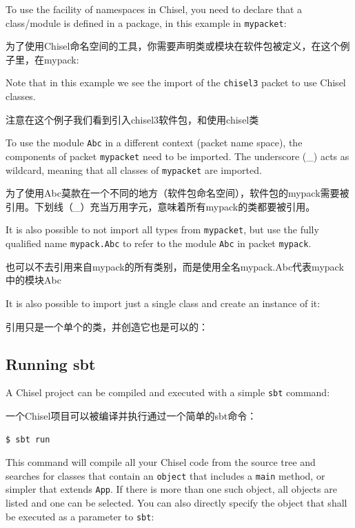 \documentclass[%
    10pt,
    headinclude, footexclude,
    openright, %
    notitlepage,
    cleardoubleempty,
    headsepline,
    pointlessnumbers,
    bibtotoc, idxtotoc,
    ]{scrbook}
\newcommand{\code}[1]{{\small{\texttt{#1}}}}
\begin{document}
To use the facility of namespaces in Chisel, you need to declare that a class/module
is defined in a package, in this example in \code{mypacket}:

为了使用Chisel命名空间的工具，你需要声明类或模块在软件包被定义，在这个例子里，在mypack:


\noindent Note that in this example we see the import of the \code{chisel3} packet
to use Chisel classes.

注意在这个例子我们看到引入chisel3软件包，和使用chisel类

To use the module \code{Abc} in a different context (packet name space),
the components of packet \code{mypacket} need to be imported. The underscore
(\_) acts as wildcard, meaning that all classes of \code{mypacket} are imported.

为了使用Abc莫款在一个不同的地方（软件包命名空间），软件包的mypack需要被引用。下划线（_）充当万用字元，意味着所有mypack的类都要被引用。



\noindent It is also possible to not import all types from \code{mypacket},
but use the fully qualified name \code{mypack.Abc} to refer to the module
\code{Abc} in packet \code{mypack}.

也可以不去引用来自mypack的所有类别，而是使用全名mypack.Abc代表mypack中的模块Abc


\noindent It is also possible to import just a single class and create an instance of it:

引用只是一个单个的类，并创造它也是可以的：



\subsection{Running sbt}

A Chisel project can be compiled and executed with a simple \code{sbt} command:

一个Chisel项目可以被编译并执行通过一个简单的sbt命令：

\begin{verbatim}
$ sbt run
\end{verbatim}

This command will compile all your Chisel code from the source tree and searches
for classes that contain an \code{object} that includes a \code{main} method, or simpler
that extends \code{App}. If there is more than one such object, all objects are listed and
one can be selected.
You can also directly specify the object that shall be executed as a parameter to \code{sbt}:
\end{document}
